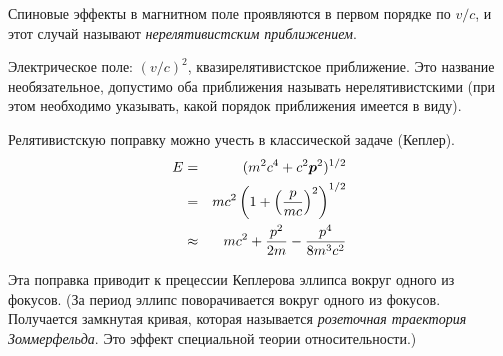 Спиновые эффекты в магнитном поле проявляются в первом порядке по $v/c$, и этот случай называют \emph{нерелятивистским приближением}.

Электрическое поле: $(v/c)^2$, квазирелятивистское приближение. Это название необязательное, допустимо оба приближения называть нерелятивистскими (при этом необходимо указывать, какой порядок приближения имеется в виду).

Релятивистскую поправку можно учесть в классической задаче (Кеплер).
\begin{eqnarray*}
    E &=& (m^2c^4 + c^2 \bf p^2)^{1/2} \\
      &=& mc^2\left(1 + \left(\frac{p}{mc}\right)^2\right)^{1/2}\\
      &\approx& mc^2 + \dfrac{p^2}{2m} - \frac{p^4}{8m^3 c^2}
\end{eqnarray*}

Эта поправка приводит к прецессии Кеплерова эллипса вокруг одного из фокусов. (За период эллипс поворачивается вокруг одного из фокусов. Получается замкнутая кривая, которая называется \emph{розеточная траектория Зоммерфельда}. Это эффект специальной теории относительности.) 